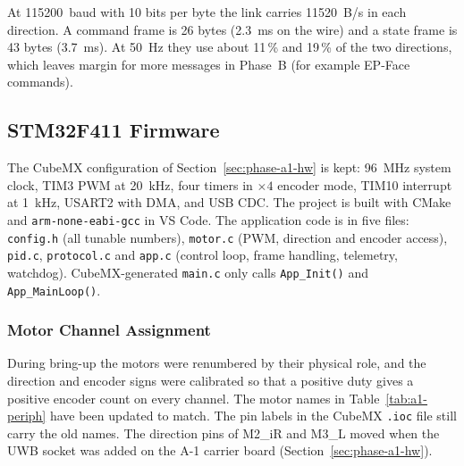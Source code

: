 \documentclass[12pt,a4paper]{article}
\begin{document}
At \SI{115200}{baud} with 10 bits per byte the link carries \SI{11520}{B/s} in each direction.
A command frame is 26 bytes (\SI{2.3}{ms} on the wire) and a state frame is 43 bytes
(\SI{3.7}{ms}). At \SI{50}{Hz} they use about 11\,\% and 19\,\% of the two directions,
which leaves margin for more messages in Phase~B (for example EP-Face commands).

\subsection{STM32F411 Firmware}
\label{pr3:sec:stm}

The CubeMX configuration of Section~\ref{sec:phase-a1-hw} is kept: \SI{96}{MHz} system clock,
TIM3 PWM at \SI{20}{kHz}, four timers in $\times4$ encoder mode, TIM10 interrupt at
\SI{1}{kHz}, USART2 with DMA, and USB CDC. The project is built with CMake and
\texttt{arm-none-eabi-gcc} in VS Code. The application code is in five files:
\texttt{config.h} (all tunable numbers), \texttt{motor.c} (PWM, direction and encoder
access), \texttt{pid.c}, \texttt{protocol.c} and \texttt{app.c} (control loop, frame handling,
telemetry, watchdog). CubeMX-generated \texttt{main.c} only calls \texttt{App\_Init()} and
\texttt{App\_MainLoop()}.

\subsubsection{Motor Channel Assignment}

During bring-up the motors were renumbered by their physical role, and the direction and
encoder signs were calibrated so that a positive duty gives a positive encoder count on
every channel. The motor names in Table~\ref{tab:a1-periph} have been updated to match. The pin labels
in the CubeMX \texttt{.ioc} file still carry the old names. The direction pins of M2\_iR and M3\_L moved when the UWB socket was added on the A-1 carrier board (Section~\ref{sec:phase-a1-hw}).
\end{document}
